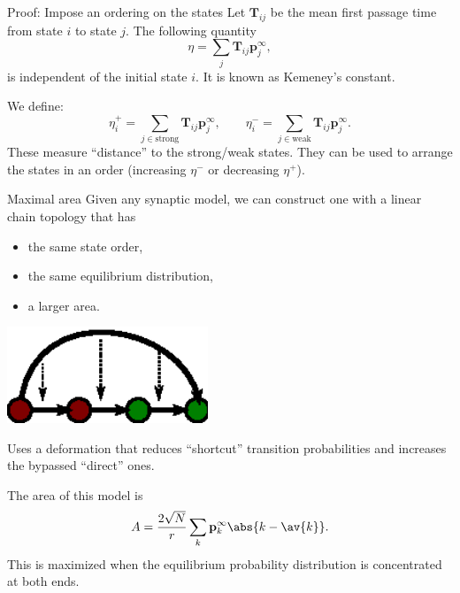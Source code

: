 \documentclass[final,hyperref={pdfpagelabels=false,bookmarks=false}]{beamer}
\newcommand{\eq}{\mathbf{p}^\infty}
\newcommand{\fpt}{\mathbf{T}}
\begin{document}
\begin{frame}{}
\begin{columns}[t]
\begin{column}{0.37\linewidth}

\begin{block}{Proof: Impose an ordering on the states}
%
 Let $\fpt_{ij}$ be the mean first passage time from state $i$ to state $j$.
 The following quantity
 \begin{equation*}
   \eta = \sum_j \fpt_{ij} \eq_j,
 \end{equation*}
 is independent of the initial state $i$.
 It is known as Kemeney's constant. 

 \vp We define:
 \begin{equation*}
   \eta^+_i = \sum_{j\in\text{strong}} \fpt_{ij} \eq_j,
   \qquad
   \eta^-_i = \sum_{j\in\text{weak}} \fpt_{ij} \eq_j.
 \end{equation*}
 These measure ``distance'' to the strong/weak states.
 They can be used to arrange the states in an order (increasing $\eta^-$ or decreasing $\eta^+$).
%
\end{block}


\begin{block}{Maximal area}
%
 Given any synaptic model, we can construct one with a linear chain topology that has
 \parbox[c]{15cm}{
  \begin{itemize}
    \item the same state order,
    \item the same equilibrium distribution,
    \item a larger area.
  \end{itemize}
 }
 \parbox[c]{15cm}{
  \begin{center}
    \includegraphics[width=6cm]{shortcut.eps}
  \end{center}
 }

 Uses a deformation that reduces ``shortcut'' transition probabilities and increases the bypassed ``direct'' ones.

 \vp The area of this model is
 \begin{equation*}
   A = \frac{2\sqrt{N}}{r}\sum_k \eq_k \abs{k-\av{k}}.
 \end{equation*}
 This is maximized when the equilibrium probability distribution is concentrated at both ends.
%
\end{block}






\end{column}
\end{columns}
\end{frame}
\end{document}
